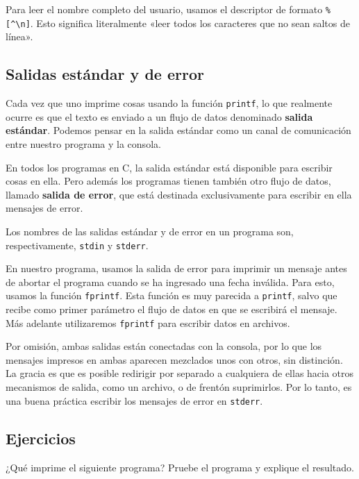 Para leer el nombre completo del usuario, usamos el descriptor de
formato \lstinline!%[^\n]!. Esto significa literalmente «leer todos los
caracteres que no sean saltos de línea».

\subsection{Salidas estándar y de error}

Cada vez que uno imprime cosas usando la función \lstinline!printf!, lo
que realmente ocurre es que el texto es enviado a un flujo de datos
denominado \textbf{salida estándar}. Podemos pensar en la salida
estándar como un canal de comunicación entre nuestro programa y la
consola.

En todos los programas en C, la salida estándar está disponible para
escribir cosas en ella. Pero además los programas tienen también otro
flujo de datos, llamado \textbf{salida de error}, que está destinada
exclusivamente para escribir en ella mensajes de error.

Los nombres de las salidas estándar y de error en un programa son,
respectivamente, \lstinline!stdin! y \lstinline!stderr!.

En nuestro programa, usamos la salida de error para imprimir un mensaje
antes de abortar el programa cuando se ha ingresado una fecha inválida.
Para esto, usamos la función \lstinline!fprintf!. Esta función es muy
parecida a \lstinline!printf!, salvo que recibe como primer parámetro el
flujo de datos en que se escribirá el mensaje. Más adelante utilizaremos
\lstinline!fprintf! para escribir datos en archivos.

Por omisión, ambas salidas están conectadas con la consola, por lo que
los mensajes impresos en ambas aparecen mezclados unos con otros, sin
distinción. La gracia es que es posible redirigir por separado a
cualquiera de ellas hacia otros mecanismos de salida, como un archivo, o
de frentón suprimirlos. Por lo tanto, es una buena práctica escribir los
mensajes de error en \lstinline!stderr!.

\subsection{Ejercicios}

¿Qué imprime el siguiente programa? Pruebe el programa y explique el
resultado.
